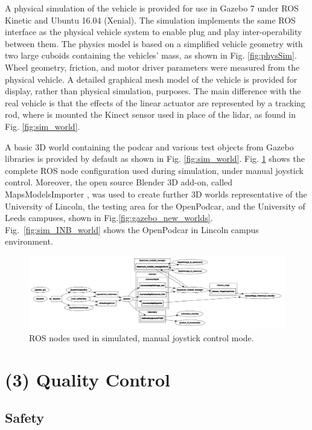 \documentclass[a4paper]{article}
\begin{document}
	A physical simulation of the vehicle is provided for use in Gazebo 7 \cite{koenig2004design} under ROS Kinetic and Ubuntu 16.04 (Xenial). The simulation implements the same ROS interface as the physical vehicle system to enable plug and play inter-operability between them. The physics model is based on a simplified vehicle geometry with two large cuboids containing the vehicles’ mass, as shown in Fig. \ref{fig:physSim}. Wheel geometry, friction, and motor driver parameters were measured from the physical vehicle. A detailed graphical mesh model of the vehicle is provided for display, rather than physical simulation, purposes. The main difference with the real vehicle is that the effects of the linear actuator are represented by a tracking rod, where is mounted the Kinect sensor used in place of the lidar, as found in Fig. \ref{fig:sim_world}.
	
	A basic 3D world containing the podcar and various test objects from Gazebo libraries is provided by default as shown in Fig. \ref{fig:sim_world}. Fig. \ref{fig:sim_nodes} shows the complete ROS node configuration used during simulation, under manual joystick control. Moreover, the open source Blender 3D add-on, called MapsModelsImporter \cite{michelmaps}, was used to create further 3D worlds representative of the University of Lincoln, the testing area for the OpenPodcar, and the University of Leeds campuses, shown in Fig.\ref{fig:gazebo_new_worlds}. Fig.~\ref{fig:sim_INB_world} shows the OpenPodcar in Lincoln campus environment.
	
	\begin{figure}[h]
		\includegraphics[width=\columnwidth]{figs_sim/sim_nodes.png}
		\caption{ROS nodes used in simulated,  manual joystick control mode.}
		\label{fig:sim_nodes}
	\end{figure}
	
	\section{(3) Quality Control}\label{h.f8237gmzmwc6}
	
	\subsection{Safety}\label{h.v60aduckfisj}
	
\end{document}
